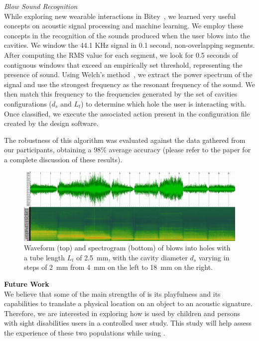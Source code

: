           \textit{Blow Sound Recognition}\\
            While exploring new wearable interactions in
            Bitey~\cite{Ashbrook:2016ek}, we learned very useful concepts on
            acoustic signal processing and machine learning. We employ these
            concepts in the recognition of the sounds produced when the user
            blows into the \bh cavities. We window the 44.1 KHz signal in 0.1
            second, non-overlapping segments. After computing the RMS value for
            each segment, we look for 0.5 seconds of contiguous windows that
            exceed an empirically set threshold, representing the presence of
            sound. Using Welch's method~\cite{Welch:1967jw}, we extract the
            power spectrum of the signal and use the strongest frequency as the
            resonant frequency of the sound. We then match this frequency to
            the frequencies generated by the set of cavities configurations
            ($d_s$ and $L_t$) to determine which hole the user is interacting
            with. Once classified, we execute the associated action present in
            the configuration file created by the design software.

            The robustness of this algorithm was evaluated against the data
            gathered from our participants, obtaining a 98\% average accuracy
            (please refer to the paper for a complete discussion of these
            results).

        \begin{figure}[t]
          \centering
            \includegraphics[width=\textwidth]{figures/spectrogram.png}
            \caption{Waveform (top) and spectrogram (bottom) of blows into
              holes with a tube length $L_t$ of 2.5~mm, with the cavity diameter
              $d_s$ varying in steps of 2~mm from 4~mm on the left to 18~mm on
              the right.}
            \label{fig:spectrogram}
        \end{figure}

      \textbf{Future Work}\\
        We believe that some of the main strengths of \bh is its playfulness
        and its capabilities to translate a physical location on an object to
        an acoustic signature. Therefore, we are interested in exploring how
        \bh is used by children and persons with sight disabilities users in a
        controlled user study. This study will help assess the experience of
        these two populations while using \bh.


